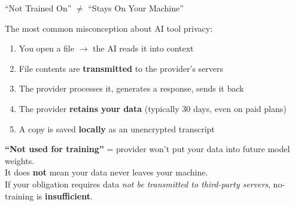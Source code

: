 \documentclass[aspectratio=169, 10pt]{beamer}
\begin{document}
\begin{frame}{``Not Trained On'' $\neq$ ``Stays On Your Machine''}

\small The most common misconception about AI tool privacy:

\vspace{0.15cm}

\begin{tcolorbox}[keybox, title={\faExclamationTriangle\quad What Actually Happens When You Use an AI Tool}]
\begin{enumerate}\footnotesize
  \item You open a file $\to$ the AI reads it into context
  \item File contents are \textbf{transmitted} to the provider's servers
  \item The provider processes it, generates a response, sends it back
  \item The provider \textbf{retains your data} (typically 30 days, even on paid plans)
  \item A copy is saved \textbf{locally} as an unencrypted transcript
\end{enumerate}
\end{tcolorbox}

\vspace{0.15cm}

\begin{tcolorbox}[accentbox]
\centering
\small\textbf{``Not used for training''} = provider won't put your data into future model weights.\\[2pt]
It does \textbf{not} mean your data never leaves your machine.\\[2pt]
\footnotesize If your obligation requires data \textit{not be transmitted to third-party servers}, no-training is \textbf{insufficient}.
\end{tcolorbox}

\end{frame}
\end{document}
